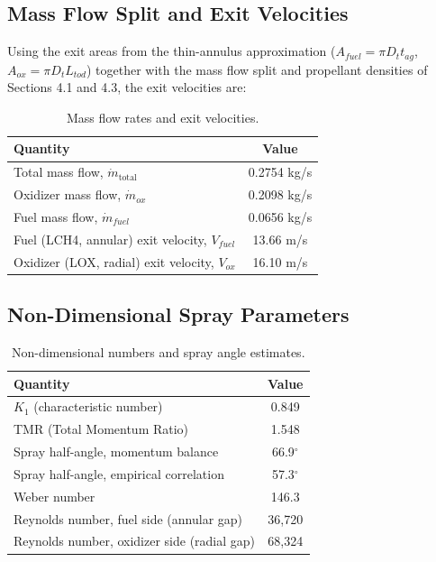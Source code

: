 \documentclass[11pt,a4paper]{article}
\begin{document}
\subsection{Mass Flow Split and Exit Velocities}

Using the exit areas from the thin-annulus approximation ($A_{fuel} = \pi D_t t_{ag}$, $A_{ox} = \pi D_t L_{tod}$) together with the mass flow split and propellant densities of Sections 4.1 and 4.3, the exit velocities are:

\begin{table}[h]
\centering
\caption{Mass flow rates and exit velocities.}
\label{tab:exit-vel}
\begin{tabular}{@{}lc@{}}
\toprule
Quantity & Value \\
\midrule
Total mass flow, $\dot{m}_{\text{total}}$ & 0.2754 kg/s \\
Oxidizer mass flow, $\dot{m}_{ox}$ & 0.2098 kg/s \\
Fuel mass flow, $\dot{m}_{fuel}$ & 0.0656 kg/s \\
Fuel (LCH4, annular) exit velocity, $V_{fuel}$ & 13.66 m/s \\
Oxidizer (LOX, radial) exit velocity, $V_{ox}$ & 16.10 m/s \\
\bottomrule
\end{tabular}
\end{table}

\subsection{Non-Dimensional Spray Parameters}

\begin{table}[h]
\centering
\caption{Non-dimensional numbers and spray angle estimates.}
\label{tab:nondim}
\begin{tabular}{@{}lc@{}}
\toprule
Quantity & Value \\
\midrule
$K_1$ (characteristic number) & 0.849 \\
TMR (Total Momentum Ratio) & 1.548 \\
Spray half-angle, momentum balance & 66.9$^\circ$ \\
Spray half-angle, empirical correlation \cite{erkal2019} & 57.3$^\circ$ \\
Weber number & 146.3 \\
Reynolds number, fuel side (annular gap) & 36{,}720 \\
Reynolds number, oxidizer side (radial gap) & 68{,}324 \\
\bottomrule
\end{tabular}
\end{table}
\end{document}
